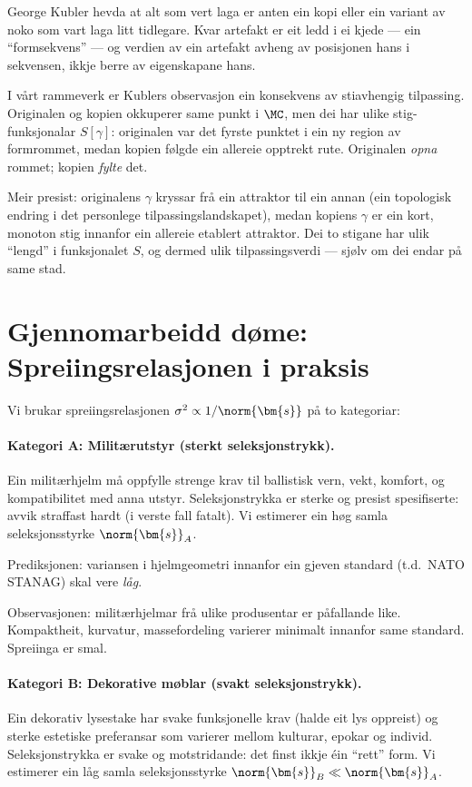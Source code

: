 George Kubler hevda at alt som vert laga er anten ein kopi eller
ein variant av noko som vart laga litt tidlegare. Kvar artefakt er
eit ledd i ei kjede --- ein ``formsekvens'' --- og verdien av ein
artefakt avheng av posisjonen hans i sekvensen, ikkje berre av
eigenskapane hans.

I vårt rammeverk er Kublers observasjon ein konsekvens av
stiavhengig tilpassing. Originalen og kopien okkuperer same punkt
i $\MC$, men dei har ulike stig-funksjonalar $S[\gamma]$:
originalen var det fyrste punktet i ein ny region av formrommet,
medan kopien følgde ein allereie opptrekt rute. Originalen
\emph{opna} rommet; kopien \emph{fylte} det.

Meir presist: originalens $\gamma$ kryssar frå ein attraktor til
ein annan (ein topologisk endring i det personlege
tilpassingslandskapet), medan kopiens $\gamma$ er ein kort,
monoton stig innanfor ein allereie etablert attraktor. Dei to
stigane har ulik ``lengd'' i funksjonalet $S$, og dermed ulik
tilpassingsverdi --- sjølv om dei endar på same stad.


\section{Gjennomarbeidd døme: Spreiingsrelasjonen i praksis}

Vi brukar spreiingsrelasjonen $\sigma^2 \propto 1/\norm{\bm{s}}$
på to kategoriar:

\paragraph{Kategori A: Militærutstyr (sterkt seleksjonstrykk).}
Ein militærhjelm må oppfylle strenge krav til ballistisk vern,
vekt, komfort, og kompatibilitet med anna utstyr. Seleksjonstrykka
er sterke og presist spesifiserte: avvik straffast hardt (i verste
fall fatalt). Vi estimerer ein høg samla seleksjonsstyrke
$\norm{\bm{s}}_A$.

\medskip
Prediksjonen: variansen i hjelmgeometri innanfor ein gjeven
standard (t.d.\ NATO STANAG) skal vere \emph{låg}.

\medskip
Observasjonen: militærhjelmar frå ulike produsentar er
påfallande like. Kompaktheit, kurvatur, massefordeling varierer
minimalt innanfor same standard. Spreiinga er smal.

\paragraph{Kategori B: Dekorative møblar (svakt seleksjonstrykk).}
Ein dekorativ lysestake har svake funksjonelle krav (halde eit lys
oppreist) og sterke estetiske preferansar som varierer mellom
kulturar, epokar og individ. Seleksjonstrykka er svake og
motstridande: det finst ikkje éin ``rett'' form. Vi estimerer ein
låg samla seleksjonsstyrke $\norm{\bm{s}}_B \ll \norm{\bm{s}}_A$.


